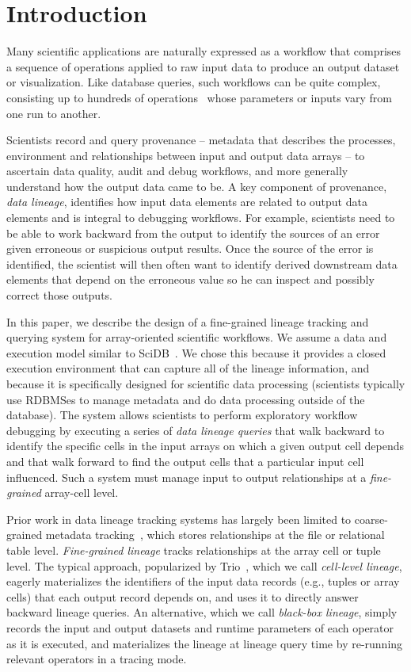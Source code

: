\section{Introduction}

Many scientific applications are naturally expressed as a workflow that
comprises a sequence of operations applied to raw input data to produce an
output dataset or visualization.  Like database queries, such workflows can be
quite complex, consisting up to hundreds of operations~\cite{lsst} whose
parameters or inputs vary from one run to another.  

Scientists record and query provenance -- metadata that describes the
processes, environment and relationships between input and output data arrays
-- to ascertain data quality, audit and debug workflows, and more generally
understand how the output data came to be. A key component of provenance, {\it
data lineage}, identifies how input data elements are related to output data
elements and is integral to debugging workflows.  For example, scientists need
to be able to work backward from the output to identify the sources of an error
given erroneous or suspicious output results.  Once the source of the error is
identified, the scientist will then often want to identify derived downstream
data elements that depend on the erroneous value so he can inspect and possibly
correct those outputs.  



In this paper, we describe the design of a fine-grained lineage tracking and
querying system for array-oriented scientific workflows.  We assume a data and
execution model similar to SciDB~\cite{scidb}.  We chose this because it
provides a closed execution environment  that can capture all of the lineage
information, and because it is specifically designed for scientific data
processing (scientists typically use RDBMSes to manage metadata and do data
processing outside of the database).  The system allows scientists to perform
exploratory workflow debugging by executing a series of {\it data lineage
queries} that walk backward to identify the specific cells in the input arrays
on which a given output cell depends and that walk forward to find the output
cells that a particular input cell influenced.  Such a system must manage input
to output relationships at a {\it fine-grained} array-cell level.

Prior work in data lineage tracking systems has largely been limited to
coarse-grained metadata tracking~\cite{taverna,genepattern}, which stores
relationships at the file or relational table level. {\it Fine-grained lineage}
tracks relationships at the array cell or tuple level.  The typical approach,
popularized by Trio~\cite{trio}, which we call {\it cell-level lineage},
eagerly materializes the identifiers of the input data records (e.g., tuples or
array cells) that each output record depends on, and  uses it to
directly answer backward lineage queries. An alternative, which we call {\it
black-box lineage}, simply records the input and output datasets and runtime
parameters of each operator as it is executed, and materializes the lineage at
lineage query time by re-running relevant operators in a tracing mode.

